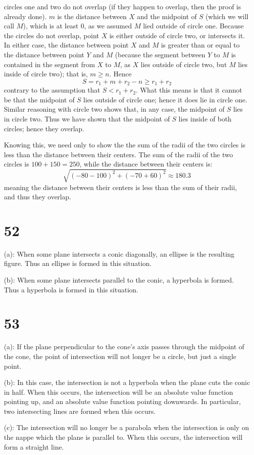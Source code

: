 \documentclass{article}
\theoremstyle{definition}
\newcommand{\?}{\stackrel{?}{=}}
\begin{document}
circles one and two do not overlap (if they happen to overlap, then the proof is already done). $m$ is the distance 
between $X$ and the midpoint of $S$ (which we will call $M$), which is at least 0, as we assumed $M$ lied outside of circle one. Because the circles do not overlap, point $X$ 
is either outside of circle two, or intersects it. In either case, the distance between point $X$ and $M$ is greater than or equal to the distance between point $Y$ and $M$ (because the 
segment between $Y$ to $M$ is contained in the segment from $X$ to $M$, as $X$ lies outside of circle two, but $M$ lies inside of circle two); that is, 
$m\ge n$. Hence \[ S=r_1+m+r_2-n\ge r_1+r_2 \] contrary to the assumption that $S<r_1+r_2$. What this means is that 
it cannot be that the midpoint of $S$ lies outside of circle one; hence it does lie in circle one. Similar reasoning with circle two shows that, in any case, the midpoint of $S$ lies in circle two.
Thus we have shown that the midpoint of $S$ lies inside of both circles; hence they overlap.


Knowing this, we need only to show the the sum of the radii of the two circles is less than the distance between their centers. The sum of the radii of the two circles 
is $100+150=250$, while the distance between their centers is:
\[ \sqrt{(-80-100)^2+(-70+60)^2}\approx 180.3 \] meaning the distance between their centers is less than the sum of their radii, and thus they overlap. 
 
\section*{52}
(a): When some plane intersects a conic diagonally, an ellipse is the resulting figure. Thus an ellipse is formed in this situation.


(b): When some plane intersects parallel to the conic, a hyperbola is formed. Thus a hyperbola is formed in this situation.

\section*{53}
(a): If the plane perpendicular to the cone's axis passes through the midpoint of the cone, the point of intersection will not longer be a circle, but just a single point.


(b): In this case, the intersection is not a hyperbola when the plane cuts the conic in half. When this occurs, the intersection will be an absolute value function pointing up, and an 
absolute value function pointing downwards. In particular, two intersecting lines are formed when this occurs.


(c): The intersection will no longer be a parabola when the intersection is only on the nappe which the plane is parallel to. When this occurs, the intersection will form a straight line.
\end{document}
